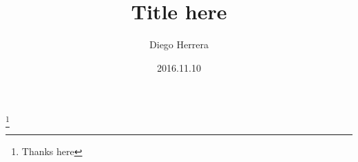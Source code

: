 \documentclass[aip,cha,10pt,a4paper,reprint,superscriptaddress]{revtex4-1}
\begin{document}
  \title{Title here}
  \author{Diego Herrera}
  \thanks{Thanks here}
  \date{2016.11.10}

  

  \maketitle

  
  
  
\end{document}
